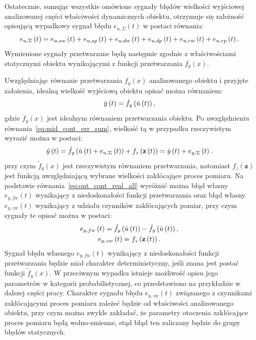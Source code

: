 Ostatecznie, sumując wszystkie omówione sygnały błędów wielkości wyjściowej analizowanej części właściwości dynamicznych obiektu, otrzymuje się zależność opisującą wypadkowy sygnał błędu $e_{u,\Sigma}(t)$ w postaci równania:
\begin{equation}
e_{u,\Sigma} \left(t\right) = e_{u,sw} \left(t\right) + e_{u,sp} \left(t\right) + e_{u,dw} \left(t\right) + e_{u,dp} \left(t\right) + e_{u,rw} \left(t\right) + e_{u,rp} \left(t\right) \label{eq:mid_cont_err_sum}.
\end{equation}
Wymienione sygnały przetwarzane będą następnie zgodnie z właściwościami statycznymi obiektu wynikającymi z funkcji przetwarzania $f_{y}(x)$.

Uwzględniając równanie przetwarzania $f_{y}(x)$ analizowanego obiektu i przyjęte założenia, idealną wielkość wyjściową obiektu opisać można równaniem:
\begin{equation}
\dot{y} \left(t\right) = \dot{f}_{y} \left( \dot{u} \left(t\right) \right) \label{eq:out_cont_ideal_all},
\end{equation}
gdzie $\dot{f}_{y}(x)$ jest idealnym równaniem przetwarzania obiektu. Po uwzględnieniu równania~\eqref{eq:mid_cont_err_sum}, wielkość tą w przypadku rzeczywistym wyrazić można w postaci:
\begin{equation}
\tilde{y} \left(t\right) = \tilde{f}_{y} \left( \dot{u} \left(t\right) + e_{u,\Sigma} \left(t\right) \right) + f_{z} \left(\mathbf{z} \left(t\right)\right) = \dot{y} \left(t\right) + e_{y,\Sigma} \left(t\right) \label{eq:out_cont_real_all}.
\end{equation}
przy czym $\tilde{f}_{y}(x)$ jest rzeczywistym równaniem przetwarzania, natomiast $f_{z}(\mathbf{z})$ jest funkcją uwzględniającą wybrane wielkości zakłócające proces pomiaru. Na podstawie równania~\eqref{eq:out_cont_real_all} wyróżnić można błąd własny $e_{y,fw}(t)$ wynikający z niedoskonałości funkcji przetwarzania oraz błąd własny $e_{y,zw}(t)$ wynikający z udziału czynników zakłócających pomiar, przy czym sygnały te opisać można w postaci:
\begin{gather}
e_{y,fw} \left(t\right) = \tilde{f}_{y} \left( \dot{u} \left(t\right) \right) - \dot{f}_{y} \left( \dot{u} \left(t\right) \right) \label{eq:out_cont_err_funct_self}, \\
e_{y,zw} \left(t\right) = f_{z} \left(\mathbf{z} \left(t\right)\right) \label{eq:out_cont_err_env_self}.
\end{gather}
Sygnał błędu własnego $e_{y,fw}(t)$ wynikający z niedoskonałości funkcji przetwarzania będzie miał charakter deterministyczny, jeśli znana jest postać funkcji $\tilde{f}_{y}(x)$. W przeciwnym wypadku istnieje możliwość opisu jego parametrów w kategorii probabilistycznej, co przedstawiono na przykładzie w dalszej części pracy. Charakter sygnału błędu $e_{y,zw}(t)$ związanego z czynnikami zakłócającymi proces pomiaru zależeć będzie od właściwości analizowanego obiektu, przy czym można zwykle zakładać, że parametry otoczenia zakłócające proces pomiaru będą wolno-zmienne, stąd błąd ten zaliczany będzie do grupy błędów statycznych.

